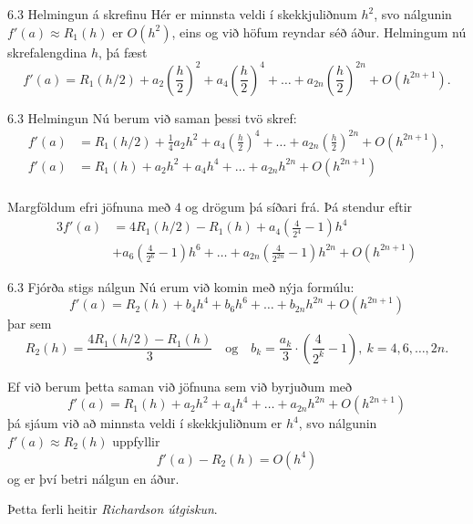 \begin{frame}{6.3 Helmingun á skrefinu} 
Hér er minnsta veldi í skekkjuliðnum $h^2$, svo nálgunin $f'(a)
\approx R_1(h)$ er $O(h^2)$, eins og við höfum reyndar séð
áður. Helmingum nú skrefalengdina $h$, þá fæst 
\begin{equation*}
  f'(a) = R_1(h/2) + a_2 \left(\frac{h}{2}\right)^2
  + a_4 \left(\frac{h}{2}\right)^4 + \ldots
  + a_{2n} \left(\frac{h}{2}\right)^{2n} + O(h^{2n+1}).
\end{equation*}
\end{frame}


\begin{frame}{6.3 Helmingun} 
Nú berum við saman þessi tvö skref:
\begin{align*}
  f'(a) &= R_1(h/2) + \tfrac 14 a_2 h^2
  + a_4 \left(\frac{h}{2}\right)^4 + \ldots
  + a_{2n} \left(\frac{h}{2}\right)^{2n} + O(h^{2n+1}),\\
  f'(a) &= R_1(h) 
  + a_2 h^2 + a_4 h^4 + \ldots + a_{2n} h^{2n} + O(h^{2n+1})\\
\end{align*}

\pause
Margföldum efri jöfnuna með $4$ og drögum þá síðari frá.  Þá stendur
eftir
\begin{align*}
  3f'(a) &= 4 R_1(h/2) - R_1(h) 
  + a_4 \left( \frac{4}{2^4} - 1 \right)h^4 \\
  &+ a_6 \left( \frac{4}{2^6} - 1 \right)h^6
  + \ldots
  + a_{2n} \left( \frac{4}{2^{2n}} - 1 \right)h^{2n}
  + O(h^{2n+1})
\end{align*}
\end{frame}


\begin{frame}{6.3 Fjórða stigs nálgun} 
Nú erum við komin með nýja formúlu:
\begin{equation*}
  f'(a) = R_2(h) + b_4 h^4 + b_6 h^6 + \ldots + b_{2n} h^{2n}
  + O(h^{2n+1})
\end{equation*}
þar sem
\begin{equation*}
  R_2(h) = \frac{4 R_1(h/2) - R_1(h)}{3}
  \quad \text{og} \quad
  b_k = \frac{a_k}{3} \cdot \left(\frac{4}{2^k}-1\right),
  \  k = 4,6,\ldots,2n.
\end{equation*}

\pause
Ef við berum þetta saman við jöfnuna sem við byrjuðum með
\begin{equation*}
  f'(a) = R_1(h) 
  + a_2 h^2 + a_4 h^4 + \ldots + a_{2n} h^{2n} + O(h^{2n+1})
\end{equation*}
þá sjáum við að minnsta veldi í skekkjuliðnum er $h^4$, svo nálgunin $f'(a)
\approx R_2(h)$ uppfyllir 
\begin{equation*}
  f'(a) - R_2(h) = O(h^4)
\end{equation*}
og er því betri nálgun en áður. 

\smallskip
 Þetta ferli heitir {\it Richardson útgiskun}.
\end{frame}


